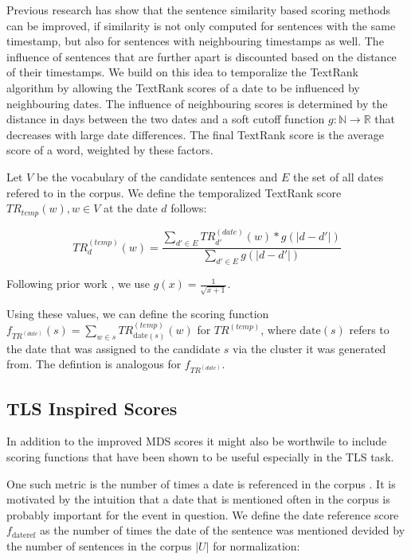 \documentclass[a4paper,BCOR=10mm]{report}
\begin{document}
Previous research \citep{yan-trans, markert} has show that the sentence similarity based scoring methods can be improved, if similarity is not only computed for sentences with the same timestamp, but also for sentences with neighbouring timestamps as well. The influence of sentences that are further apart is discounted based on the distance of their timestamps.
We build on this idea to temporalize the TextRank algorithm by allowing the TextRank scores of a date to be influenced by neighbouring dates. The influence of neighbouring scores is determined by the distance in days between the two dates and a soft cutoff function $g: \mathbb{N} \rightarrow \mathbb{R}$ that decreases with large date differences.
The final TextRank score is the average score of a word, weighted by these factors.

Let $V$ be the vocabulary of the candidate sentences and $E$ the set of all dates refered to in the corpus. We define the temporalized TextRank score $TR_{temp}(w), w \in V$ at the date $d$ follows:

\begin{displaymath}
    TR^{(temp)}_d(w) = \frac{\sum_{d' \in E} TR^{(date)}_{d'}(w) * g(|d - d'|)}{\sum_{d' \in E} g(|d - d'|)}
\end{displaymath}

Following prior work \citep{markert}, we use $g(x) = \frac{1}{\sqrt{x + 1}}$.

Using these values, we can define the scoring function $f_{TR^{(date)}}(s) = \sum_{w \in s} TR^{(temp)}_{\text{date}(s)}(w)$ for $TR^{(temp)}$, where $\text{date}(s)$ refers to the date that was assigned to the candidate $s$ via the cluster it was generated from.
The defintion is analogous for $f_{TR^{(date)}}$.

\subsection{TLS Inspired Scores} \label{sec:tls-scores}

In addition to the improved MDS scores it might also be worthwile to include scoring functions that have been shown to be useful especially in the TLS task.

One such metric is the number of times a date is referenced in the corpus \citep{markert, datesel-graph}. It is motivated by the intuition that a date that is mentioned often in the corpus is probably important for the event in question. We define the date reference score $f_{\text{dateref}}$ as the number of times the date of the sentence was mentioned devided by the number of sentences in the corpus $|U|$ for normalization:
\end{document}

